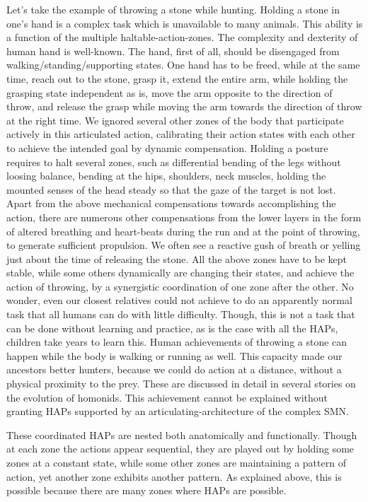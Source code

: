 Let's take the example of throwing a stone while hunting. Holding a stone in one's hand is a complex task which is unavailable to many animals. This ability is a function of the multiple haltable-action-zones. The complexity and dexterity of human hand is well-known. The hand, first of all, should be disengaged from walking/standing/supporting states. One hand has to be freed, while at the same time, reach out to the stone, grasp it, extend the entire arm, while holding the grasping state independent as is, move the arm opposite to the direction of throw, and release the grasp while moving the arm towards the direction of throw at the right time. We ignored several other zones of the body that participate actively in this articulated action, calibrating their action states with each other to achieve the intended goal by dynamic compensation. Holding a posture requires to halt several zones, such as differential bending of the legs without loosing balance, bending at the hips, shoulders, neck muscles, holding the mounted senses of the head steady so that the gaze of the target is not lost. Apart from the above mechanical compensations towards accomplishing the action, there are numerous other compensations from the lower layers in the form of altered breathing and heart-beats during the run and at the point of throwing, to generate sufficient propulsion. We often see a reactive gush of breath or yelling just about the time of releasing the stone. All the above zones have to be kept stable, while some others dynamically are changing their states, and achieve the action of throwing, by a synergistic coordination of one zone after the other. No wonder, even our closest relatives could not achieve to do an apparently normal task that all humans can do with little difficulty. Though, this is not a task that can be done without learning and practice, as is the case with all the HAPs,  children take years to learn this. Human achievements of throwing a stone can happen while the body is walking or running as well. This capacity made our ancestors better hunters, because we could do action at a distance, without a physical proximity to the prey. These are discussed in detail in several stories on the evolution of homonids. This achievement cannot be explained without granting HAPs supported by an articulating-architecture of the complex SMN.   

These coordinated HAPs are nested both anatomically and functionally. Though at each zone the actions appear sequential, they are played out by holding some zones at a constant state, while some other zones are maintaining a pattern of action, yet another zone exhibits another pattern. As explained above, this is possible because there are many zones where HAPs are possible.

